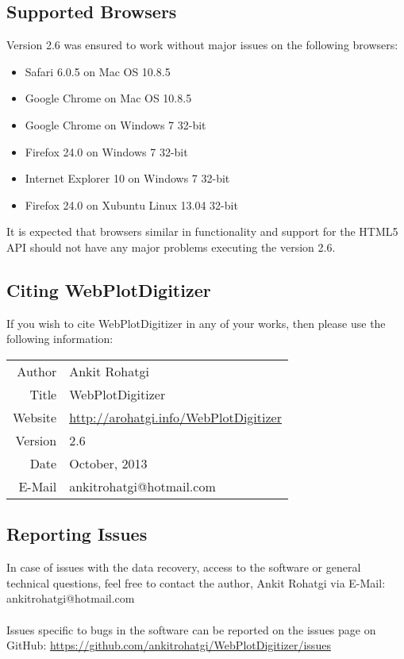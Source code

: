 \documentclass[letterpaper, 10pt]{article}
\begin{document}
\subsection{Supported Browsers}
Version 2.6 was ensured to work without major issues on the following browsers:
\begin{itemize}
\item{Safari 6.0.5 on Mac OS 10.8.5}
\item{Google Chrome on Mac OS 10.8.5}
\item{Google Chrome on Windows 7 32-bit}
\item{Firefox 24.0 on Windows 7 32-bit}
\item{Internet Explorer 10 on Windows 7 32-bit}
\item{Firefox 24.0 on Xubuntu Linux 13.04 32-bit}
\end{itemize}
It is expected that browsers similar in functionality and support for the HTML5 API should not have any major problems executing the version 2.6.

\subsection{Citing WebPlotDigitizer}
If you wish to cite WebPlotDigitizer in any of your works, then please use the following information:

\begin{center}
\begin{tabular}{|r|l|}
\hline
Author & Ankit Rohatgi\\
Title & WebPlotDigitizer\\
Website & \url{http://arohatgi.info/WebPlotDigitizer}\\
Version & 2.6\\
Date & October, 2013\\
E-Mail & ankitrohatgi@hotmail.com\\
\hline
\end{tabular}
\end{center}


\subsection{Reporting Issues}
In case of issues with the data recovery, access to the software or general technical questions, feel free to contact the author, Ankit Rohatgi via E-Mail: ankitrohatgi@hotmail.com
\\
\\
Issues specific to bugs in the software can be reported on the issues page on GitHub: \url{https://github.com/ankitrohatgi/WebPlotDigitizer/issues}
\end{document}
